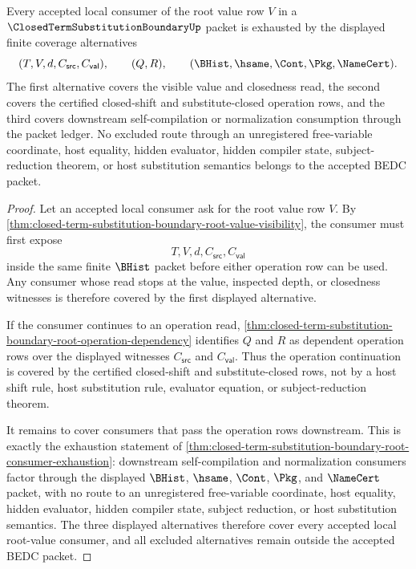 \begin{theorem}
\label{thm:closed-term-substitution-boundary-root-value-downstream-coverage}
Every accepted local consumer of the root value row $V$ in a $\ClosedTermSubstitutionBoundaryUp$ packet is exhausted by the displayed finite coverage alternatives
$$
(T,V,d,C_{\mathsf{src}},C_{\mathsf{val}}),\qquad (Q,R),\qquad (\BHist,\hsame,\Cont,\Pkg,\NameCert).
$$
The first alternative covers the visible value and closedness read, the second covers the certified closed-shift and substitute-closed operation rows, and the third covers downstream self-compilation or normalization consumption through the packet ledger. No excluded route through an unregistered free-variable coordinate, host equality, hidden evaluator, hidden compiler state, subject-reduction theorem, or host substitution semantics belongs to the accepted BEDC packet.
\end{theorem}
\begin{proof}
Let an accepted local consumer ask for the root value row $V$. By \autoref{thm:closed-term-substitution-boundary-root-value-visibility}, the consumer must first expose
$$
T,V,d,C_{\mathsf{src}},C_{\mathsf{val}}
$$
inside the same finite $\BHist$ packet before either operation row can be used. Any consumer whose read stops at the value, inspected depth, or closedness witnesses is therefore covered by the first displayed alternative.

If the consumer continues to an operation read, \autoref{thm:closed-term-substitution-boundary-root-operation-dependency} identifies $Q$ and $R$ as dependent operation rows over the displayed witnesses $C_{\mathsf{src}}$ and $C_{\mathsf{val}}$. Thus the operation continuation is covered by the certified closed-shift and substitute-closed rows, not by a host shift rule, host substitution rule, evaluator equation, or subject-reduction theorem.

It remains to cover consumers that pass the operation rows downstream. This is exactly the exhaustion statement of \autoref{thm:closed-term-substitution-boundary-root-consumer-exhaustion}: downstream self-compilation and normalization consumers factor through the displayed $\BHist$, $\hsame$, $\Cont$, $\Pkg$, and $\NameCert$ packet, with no route to an unregistered free-variable coordinate, host equality, hidden evaluator, hidden compiler state, subject reduction, or host substitution semantics. The three displayed alternatives therefore cover every accepted local root-value consumer, and all excluded alternatives remain outside the accepted BEDC packet.
\end{proof}
